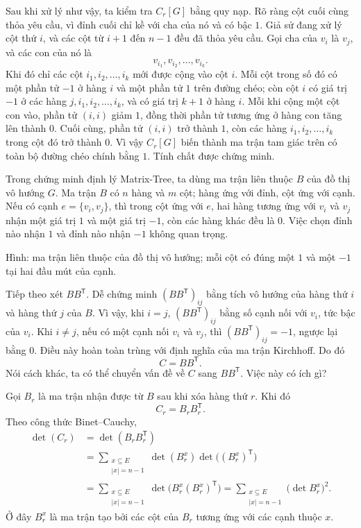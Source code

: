 \documentclass[11pt]{article}
\begin{document}
Sau khi xử lý như vậy, ta kiểm tra \(C_r[G]\) bằng quy nạp. Rõ ràng cột cuối
cùng thỏa yêu cầu, vì đỉnh cuối chỉ kề với cha của nó và có bậc \(1\). Giả sử
đang xử lý cột thứ \(i\), và các cột từ \(i+1\) đến \(n-1\) đều đã thỏa yêu
cầu. Gọi cha của \(v_i\) là \(v_j\), và các con của nó là
\[
  v_{i_1},v_{i_2},\ldots,v_{i_k}.
\]
Khi đó chỉ các cột \(i_1,i_2,\ldots,i_k\) mới được cộng vào cột \(i\). Mỗi
cột trong số đó có một phần tử \(-1\) ở hàng \(i\) và một phần tử \(1\) trên
đường chéo; còn cột \(i\) có giá trị \(-1\) ở các hàng
\(j,i_1,i_2,\ldots,i_k\), và có giá trị \(k+1\) ở hàng \(i\). Mỗi khi cộng một
cột con vào, phần tử \((i,i)\) giảm \(1\), đồng thời phần tử tương ứng ở hàng
con tăng lên thành \(0\). Cuối cùng, phần tử \((i,i)\) trở thành \(1\), còn
các hàng \(i_1,i_2,\ldots,i_k\) trong cột đó trở thành \(0\). Vì vậy
\(C_r[G]\) biến thành ma trận tam giác trên có toàn bộ đường chéo chính bằng
\(1\). Tính chất được chứng minh.

Trong chứng minh định lý Matrix-Tree, ta dùng ma trận liên thuộc \(B\) của đồ
thị vô hướng \(G\). Ma trận \(B\) có \(n\) hàng và \(m\) cột; hàng ứng với đỉnh,
cột ứng với cạnh. Nếu có cạnh \(e=\{v_i,v_j\}\), thì trong cột ứng với \(e\),
hai hàng tương ứng với \(v_i\) và \(v_j\) nhận một giá trị \(1\) và một giá trị
\(-1\), còn các hàng khác đều là \(0\). Việc chọn đỉnh nào nhận \(1\) và đỉnh
nào nhận \(-1\) không quan trọng.

\begin{center}
  \small Hình: ma trận liên thuộc của đồ thị vô hướng; mỗi cột có đúng một
  \(1\) và một \(-1\) tại hai đầu mút của cạnh.
\end{center}

Tiếp theo xét \(BB^{\mathsf T}\). Dễ chứng minh
\((BB^{\mathsf T})_{ij}\) bằng tích vô hướng của hàng thứ \(i\) và hàng thứ
\(j\) của \(B\). Vì vậy, khi \(i=j\), \((BB^{\mathsf T})_{ij}\) bằng số cạnh
nối với \(v_i\), tức bậc của \(v_i\). Khi \(i\ne j\), nếu có một cạnh nối
\(v_i\) và \(v_j\), thì \((BB^{\mathsf T})_{ij}=-1\), ngược lại bằng \(0\).
Điều này hoàn toàn trùng với định nghĩa của ma trận Kirchhoff. Do đó
\[
  C=BB^{\mathsf T}.
\]
Nói cách khác, ta có thể chuyển vấn đề về \(C\) sang \(BB^{\mathsf T}\). Việc
này có ích gì?

Gọi \(B_r\) là ma trận nhận được từ \(B\) sau khi xóa hàng thứ \(r\). Khi đó
\[
  C_r=B_rB_r^{\mathsf T}.
\]
Theo công thức Binet--Cauchy,
\[
\begin{aligned}
  \det(C_r)
  &=\det(B_rB_r^{\mathsf T})\\
  &=
  \sum_{\substack{x\subseteq E\\ |x|=n-1}}
  \det(B_r^x)\det\!\bigl((B_r^x)^{\mathsf T}\bigr)\\
  &=
  \sum_{\substack{x\subseteq E\\ |x|=n-1}}
  \det\!\bigl(B_r^x(B_r^x)^{\mathsf T}\bigr)
  =
  \sum_{\substack{x\subseteq E\\ |x|=n-1}}
  \bigl(\det B_r^x\bigr)^2.
\end{aligned}
\]
Ở đây \(B_r^x\) là ma trận tạo bởi các cột của \(B_r\) tương ứng với các cạnh
thuộc \(x\).
\end{document}
